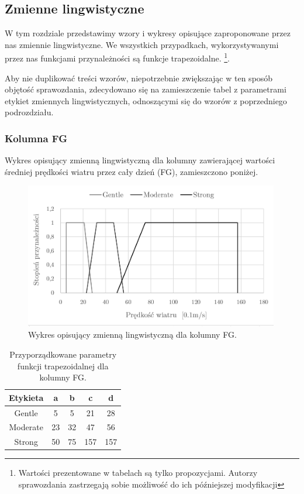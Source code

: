 \documentclass{classrep}
\begin{document}
\subsection{Zmienne lingwistyczne}
W tym rozdziale przedstawimy wzory i wykresy opisujące zaproponowane przez nas zmiennie lingwistyczne. We wszystkich przypadkach, wykorzystywanymi przez nas funkcjami przynależności są funkcje trapezoidalne.  \footnote{Wartości prezentowane w tabelach są tylko propozycjami. Autorzy sprawozdania zastrzegają sobie możliwość do ich późniejszej modyfikacji}.\newline

Aby nie duplikować treści wzorów, niepotrzebnie zwiększając w ten sposób objętość sprawozdania, zdecydowano się na zamieszczenie tabel z parametrami etykiet zmiennych lingwistycznych, odnoszącymi się do wzorów z poprzedniego podrozdziału.

\clearpage



\subsubsection{Kolumna FG}
Wykres opisujący zmienną lingwistyczną dla kolumny zawierającej wartości średniej prędkości wiatru przez cały dzień (FG), zamieszczono poniżej.
\begin{figure}[H]
	\centering
	\includegraphics[width=0.99\textwidth]{Pictures/TermsCharts/FG.png}
	\caption{Wykres opisujący zmienną lingwistyczną dla kolumny FG.}
\end{figure}

\begin{table}[H]
	\centering
	\begin{tabular}{c c c c c} 
		\hline
		\textbf{Etykieta} & \textbf{a} & \textbf{b} & \textbf{c} & \textbf{d}\\ [0.5ex] 
		\hline
		\hline 
Gentle	 & 5 & 5 & 21 & 28 \\
Moderate & 23 & 32 & 47 & 56 \\
Strong	 & 50 & 75 & 157 & 157 \\
		\hline
	\end{tabular}
	\caption{Przyporządkowane parametry funkcji trapezoidalnej dla kolumny FG.}
\end{table}
\end{document}

